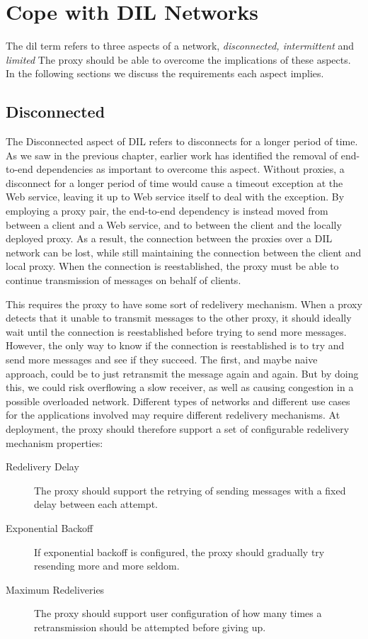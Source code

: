 \section{Cope with DIL Networks}

The \gls{dil} term refers to three aspects of a network, \textit{disconnected,
intermittent} and \textit{limited} The proxy should be able to
overcome the implications of these aspects. In the following sections we discuss
the requirements each aspect implies.

\subsection{Disconnected}

The Disconnected aspect of DIL refers to disconnects for a longer period of
time. As we saw in the previous chapter, earlier work has identified the removal
of end-to-end dependencies as important to overcome this aspect. Without
proxies, a disconnect for a longer period of time would cause a timeout
exception at the Web service, leaving it up to Web service itself to deal with
the exception. By employing a proxy pair, the end-to-end dependency is instead
moved from between a client and a Web service, and to between the client and the
locally deployed proxy. As a result, the connection between the proxies over a
DIL network can be lost, while still maintaining the connection between the
client and local proxy. When the connection is reestablished, the proxy must be
able to continue transmission of messages on behalf of clients.

This requires the proxy to have some sort of redelivery mechanism. When a proxy
detects that it unable to transmit messages to the other proxy, it should
ideally wait until the connection is reestablished before trying to send more
messages. However, the only way to know if the connection is reestablished is to
try and send more messages and see if they succeed. The first, and maybe naive
approach, could be to just retransmit the message again and again. But by doing
this, we could risk overflowing a slow receiver, as well as causing congestion
in a possible overloaded network. Different types of networks and different use
cases for the applications involved may require different redelivery mechanisms.
At deployment, the proxy should therefore support a  set of configurable
redelivery mechanism properties:

\begin{description}

    \item[Redelivery Delay] The proxy should support the retrying of sending messages
    with a fixed delay between each attempt.

    \item[Exponential Backoff] If exponential backoff is configured, the proxy
    should gradually try resending more and more seldom.

    \item[Maximum Redeliveries] The proxy should support user configuration of
    how many times a retransmission should be attempted before giving up.

\end{description}


